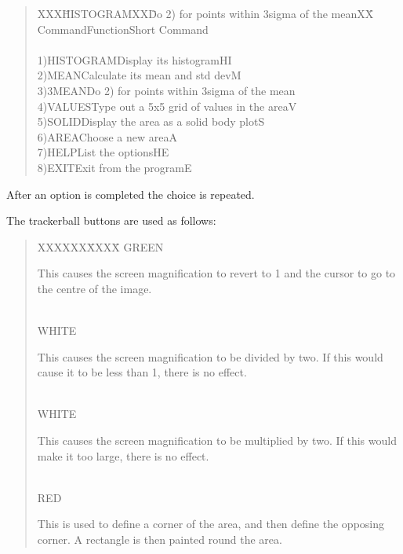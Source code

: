 \begin{description}
\begin{quote}
\begin{tabbing}
XXX\=HISTOGRAMXX\=Do 2) for points within 3sigma of the meanXX\=\kill
\>Command\>Function\>Short Command\\
\\
1)\>HISTOGRAM\>Display its histogram\>HI\\
2)\>MEAN\>Calculate its mean and std dev\>M\\
3)\>3MEAN\>Do 2) for points within 3sigma of the mean\\
4)\>VALUES\>Type out a 5x5 grid of values in the area\>V\\
5)\>SOLID\>Display the area as a solid body plot\>S\\
6)\>AREA\>Choose a new area\>A\\
7)\>HELP\>List the options\>HE\\
8)\>EXIT\>Exit from the program\>E
\end{tabbing}
\end{quote}
After an option is completed the choice is repeated.

The trackerball buttons are used as follows:
\begin{quote}
\begin{tabbing}
XXXXXX\=XXXX\=\kill
GREEN\>\begin{minipage}[t]{100mm}
This causes the screen magnification to revert to 1 and the cursor to go to
the centre of the image.
\end{minipage}\\
WHITE\>\begin{minipage}[t]{100mm}
This causes the screen magnification to be divided by two.
If this would cause it to be less than 1, there is no effect.
\end{minipage}\\
WHITE\>\begin{minipage}[t]{100mm}
This causes the screen magnification to be multiplied by two.
If this would make it too large, there is no effect.
\end{minipage}\\
RED\>\begin{minipage}[t]{100mm}
This is used to define a corner of the area, and then define the opposing
corner.
A rectangle is then painted round the area.
\end{minipage}
\end{tabbing}
\end{quote}
\end{description}

